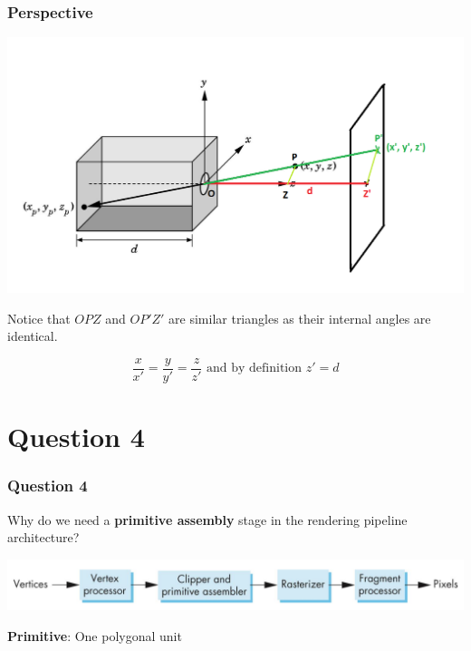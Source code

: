 \documentclass{beamer}
\begin{document}
\begin{frame}
    \frametitle{Perspective}

    \begin{center}
        \includegraphics[scale=0.25]{q3-qn.png}
    \end{center}

    Notice that $OPZ$ and $OP'Z'$ are similar triangles as their internal angles are identical.

    $$
    \frac{x}{x'} = \frac{y}{y'} = \frac{z}{z'} \text{ and by definition } z' = d
    $$

\end{frame}

\section{Question 4}

\begin{frame}
    \frametitle{Question 4}
    Why do we need a \textbf{primitive assembly} stage in the rendering pipeline architecture?

    \vspace{1em}

    {\centering \includegraphics[scale=0.4]{simple-pipeline.png}}

    \begin{tcolorbox}
        \textbf{Primitive}: One polygonal unit
    \end{tcolorbox}
\end{frame}
\end{document}
